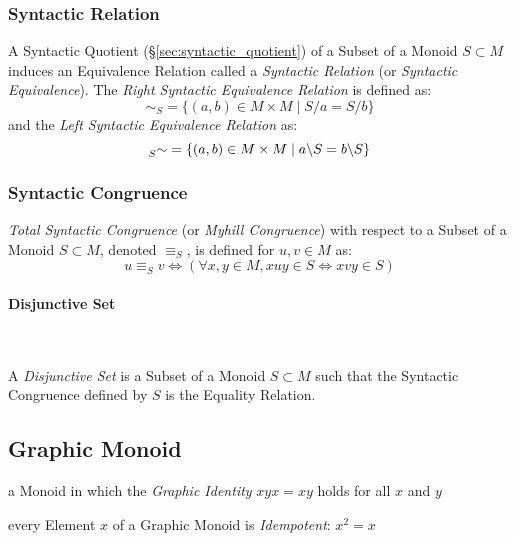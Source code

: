 \subsubsection{Syntactic Relation}\label{sec:syntactic_relation}

A Syntactic Quotient (\S\ref{sec:syntactic_quotient}) of a Subset of a
Monoid $S \subset M$ induces an Equivalence Relation called a
\emph{Syntactic Relation} (or \emph{Syntactic Equivalence}). The
\emph{Right Syntactic Equivalence Relation} is defined as:
\[
  \sim_S = \{ (a,b) \in M \times M \;|\; S/a = S/b\}
\]
and the \emph{Left Syntactic Equivalence Relation} as:
\[
  \prescript{}{S}{\sim} = \{ (a,b) \in M \times M \;|\;
  a \backslash S = b \backslash S \}
\]



\subsubsection{Syntactic Congruence}\label{sec:syntactic_congruence}

\emph{Total Syntactic Congruence} (or \emph{Myhill Congruence}) with
respect to a Subset of a Monoid $S \subset M$, denoted $\equiv_S$, is
defined for $u,v \in M$ as:
\[
  u \equiv_S v \Leftrightarrow
  (\forall x,y \in M, xuy \in S \Leftrightarrow xvy \in S)
\]



\paragraph{Disjunctive Set}\label{sec:disjunctive_set}\hfill \\\hfill

A \emph{Disjunctive Set} is a Subset of a Monoid $S \subset M$ such
that the Syntactic Congruence defined by $S$ is the Equality Relation.



\subsection{Graphic Monoid}\label{sec:graphic_monoid}

a Monoid in which the \emph{Graphic Identity} $xyx = xy$ holds for all $x$ and
$y$

every Element $x$ of a Graphic Monoid is \emph{Idempotent}: $x^2 = x$

